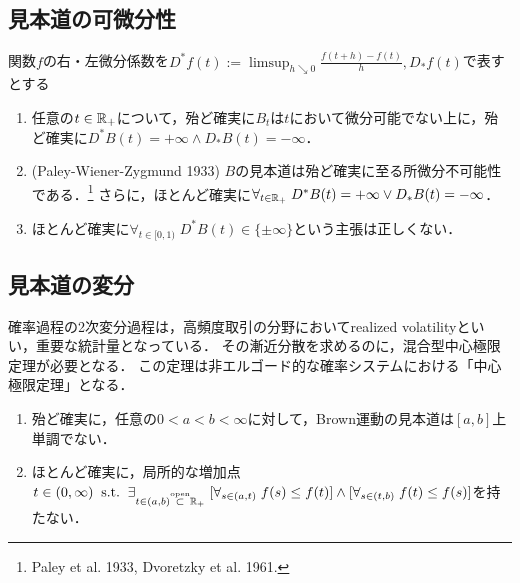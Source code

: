 \documentclass[uplatex,dvipdfmx]{jsreport}
\begin{document}
\subsection{見本道の可微分性}


\begin{proposition}
    関数$f$の右・左微分係数を$D^*f(t):=\limsup_{h\searrow0}\frac{f(t+h)-f(t)}{h},D_*f(t)$で表すとする
    \begin{enumerate}
        \item 任意の$t\in\mathbb{R}_+$について，殆ど確実に$B_t$は$t$において微分可能でない上に，殆ど確実に$D^*B(t)=+\infty\land D_*B(t)=-\infty$．
        \item (Paley-Wiener-Zygmund 1933) $B$の見本道は殆ど確実に至る所微分不可能性である．\footnote{Paley et al. 1933, Dvoretzky et al. 1961.}
        さらに，ほとんど確実に$\forall_{t\in\mathbb{R}_+}\;D^*B(t)=+\infty\lor D_*B(t)=-\infty$．
        \item ほとんど確実に$\forall_{t\in[0,1)}\;D^*B(t)\in\{\pm\infty\}$という主張は正しくない．
    \end{enumerate}
\end{proposition}

\subsection{見本道の変分}

\begin{tcolorbox}[colframe=ForestGreen, colback=ForestGreen!10!white,breakable,colbacktitle=ForestGreen!40!white,coltitle=black,fonttitle=\bfseries\sffamily,
title=]
    確率過程の2次変分過程は，高頻度取引の分野においてrealized volatilityといい，重要な統計量となっている．
    その漸近分散を求めるのに，混合型中心極限定理が必要となる．
    この定理は非エルゴード的な確率システムにおける「中心極限定理」となる．
\end{tcolorbox}

\begin{proposition}[erratic]\mbox{}
    \begin{enumerate}
        \item 殆ど確実に，任意の$0<a<b<\infty$に対して，Brown運動の見本道は$[a,b]$上単調でない．
        \item ほとんど確実に，局所的な増加点$t\in(0,\infty)\;\;\mathrm{s.t.}\;\;\exists_{t\in(a,b)\overset{\mathrm{open}}{\subset}\mathbb{R}_+}\;[\forall_{s\in(a,t)}\;f(s)\le f(t)]\land[\forall_{s\in(t,b)}\;f(t)\le f(s)]$を持たない．
    \end{enumerate}
\end{proposition}
\end{document}
